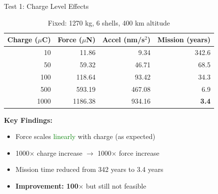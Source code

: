 \documentclass[11pt]{beamer}
\begin{document}
\begin{frame}{Test 1: Charge Level Effects}

\begin{table}[h]
\centering
\begin{tabular}{rrrr}
\toprule
\textbf{Charge ($\mu$C)} & \textbf{Force ($\mu$N)} & \textbf{Accel (nm/s$^2$)} & \textbf{Mission (years)} \\
\midrule
10 & 11.86 & 9.34 & 342.6 \\
50 & 59.32 & 46.71 & 68.5 \\
100 & 118.64 & 93.42 & 34.3 \\
500 & 593.19 & 467.08 & 6.9 \\
\rowcolor{green!20}
1000 & 1186.38 & 934.16 & \textbf{3.4} \\
\bottomrule
\end{tabular}
\caption{Fixed: 1270 kg, 6 shells, 400 km altitude}
\end{table}

\vspace{0.3cm}

\textbf{Key Findings:}
\begin{itemize}
\item Force scales \textcolor{green}{linearly} with charge (as expected)
\item 1000$\times$ charge increase $\rightarrow$ 1000$\times$ force increase
\item Mission time reduced from 342 years to 3.4 years
\item \textbf{Improvement: 100$\times$} but still not feasible
\end{itemize}

\end{frame}
\end{document}
